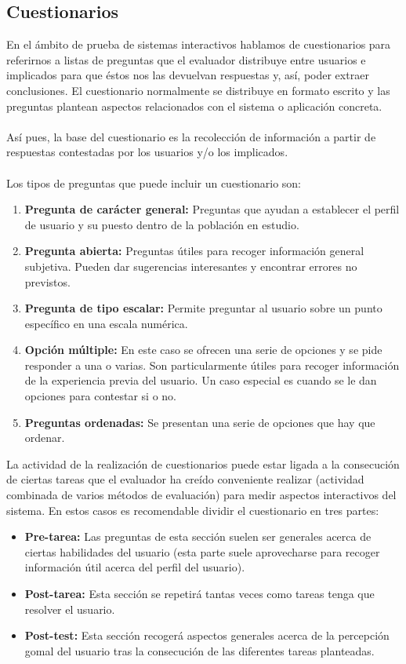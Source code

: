\subsection{Cuestionarios}
En el ámbito de prueba de sistemas interactivos hablamos de cuestionarios para referirnos a listas de preguntas que el evaluador distribuye entre usuarios e implicados para que éstos nos las devuelvan respuestas y, así, poder extraer conclusiones. El cuestionario normalmente se distribuye en formato escrito y las preguntas plantean aspectos relacionados con el sistema o aplicación concreta. \\ \\
Así pues, la base del cuestionario es la recolección de información a partir de respuestas contestadas por los usuarios y/o los implicados. \\ \\
Los tipos de preguntas que puede incluir un cuestionario son:
\begin{enumerate}
    \item \textbf{Pregunta de carácter general:} Preguntas que ayudan a establecer el perfil de usuario y su puesto dentro de la población en estudio. 
    \item \textbf{Pregunta abierta:} Preguntas útiles para recoger información general subjetiva. Pueden dar sugerencias interesantes y encontrar errores no previstos.
    \item \textbf{Pregunta de tipo escalar:} Permite preguntar al usuario sobre un punto específico en una escala numérica.   
    \item \textbf{Opción múltiple:} En este caso se ofrecen una serie de opciones y se pide responder a una o varias. Son particularmente útiles para recoger información de la experiencia previa del usuario. Un caso especial es cuando se le dan opciones para contestar si o no.
    \item \textbf{Preguntas ordenadas:} Se presentan una serie de opciones que hay que ordenar.
\end{enumerate}
La actividad de la realización de cuestionarios puede estar ligada a la consecución de ciertas tareas que el evaluador ha creído conveniente realizar (actividad combinada de varios métodos de evaluación) para medir aspectos interactivos del sistema. En estos casos es recomendable dividir el cuestionario en tres partes:
\begin{itemize}
    \item \textbf{Pre-tarea:} Las preguntas de esta sección suelen ser generales acerca de ciertas habilidades del usuario (esta parte suele aprovecharse para recoger información útil acerca del perfil del usuario).
    \item \textbf{Post-tarea:} Esta sección se repetirá tantas veces como tareas tenga que resolver el usuario.
    \item \textbf{Post-test:} Esta sección recogerá aspectos generales acerca de la percepción gomal del usuario tras la consecución de las diferentes tareas planteadas.
\end{itemize}

